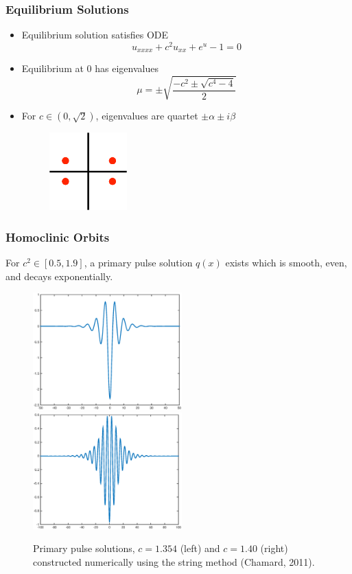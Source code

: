 \documentclass[16pt]{beamer}
\begin{document}
\begin{frame}
	\frametitle{Equilibrium Solutions}   
	\begin{itemize}
		\item Equilibrium solution satisfies ODE
            \[ u_{xxxx} + c^2 u_{xx} + e^{u} - 1 = 0 \]
        \item Equilibrium at 0 has eigenvalues
            \[ \mu = \pm \sqrt{\frac{-c^2 \pm \sqrt{c^4 - 4}}{2} } \]
        \item For $c \in (0, \sqrt{2})$, eigenvalues are quartet $\pm \alpha \pm i \beta$
        \begin{figure}
	    \begin{center}
	    \includegraphics[width=3cm]{images/quartet.eps}
	    \end{center}
	    \end{figure}

	\end{itemize}
\end{frame}

\begin{frame}
	\frametitle{Homoclinic Orbits}   
    \begin{theorem} For $c^2 \in [0.5, 1.9]$, a primary pulse solution $q(x)$ exists which is smooth, even, and decays exponentially.
    \end{theorem}
    \begin{figure}
	\begin{center}
	\includegraphics[width=5.75cm]{images/single1354.eps}
	\includegraphics[width=5.75cm]{images/single14.eps}
	\caption{Primary pulse solutions, $c = 1.354$ (left) and $c = 1.40$ (right) constructed numerically using the string method (Chamard, 2011).} 
	\end{center}
	\end{figure}
\end{frame}
\end{document}
